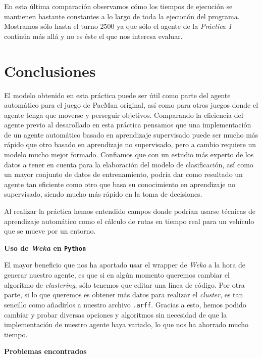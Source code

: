 \documentclass[12pt]{article}
\begin{document}
En esta última comparación observamos cómo los tiempos de ejecución se mantienen bastante constantes a lo largo de toda la ejecución del programa. Mostramos sólo hasta el turno 2500 ya que sólo el agente de la \textit{Práctica 1} continúa más allá y no es éste el que nos interesa evaluar.


\newpage
\section{Conclusiones}

El modelo obtenido en esta práctica puede ser útil como parte del agente automático para el juego de PacMan original, así como para otros juegos donde el agente tenga que moverse y perseguir objetivos. Comparando la eficiencia del agente previo al desarollado en esta práctica pensamos que una implementación de un agente automático basado en aprendizaje supervisado puede ser mucho más rápido que otro basado en aprendizaje no supervisado, pero a cambio requiere un modelo mucho mejor formado. Confiamos que con un estudio más experto de los datos a tener en cuenta para la elaboración del modelo de clasificación, así como un mayor conjunto de datos de entrenamiento, podría dar como resultado un agente tan eficiente como otro que basa su conocimiento en aprendizaje no supervisado, siendo mucho más rápido en la toma de decisiones.

Al realizar la práctica hemos entendido campos donde podrían usarse técnicas de aprendizaje automático como el cálculo de rutas en tiempo real para un vehículo que se mueve por un entorno.

\vspace{0.5cm}
\centerline{\textbf{Uso de \textit{Weka} en \texttt{Python}}}
\vspace{0.5cm}

El mayor beneficio que nos ha aportado usar el wrapper de \textit{Weka} a la hora de generar nuestro agente, es que si en algún momento queremos cambiar el algoritmo de \textit{clustering}, sólo tenemos que editar una línea de código. Por otra parte, si lo que queremos es obtener más datos para realizar el \textit{cluster}, es tan sencillo como añadirlos a nuestro archivo \texttt{.arff}. Gracias a esto, hemos podido cambiar y probar diversas opciones y algoritmos sin necesidad de que la implementación de nuestro agente haya variado, lo que nos ha ahorrado mucho tiempo.

\vspace{0.5cm}
\centerline{\textbf{Problemas encontrados}}
\vspace{0.5cm}
\end{document}
